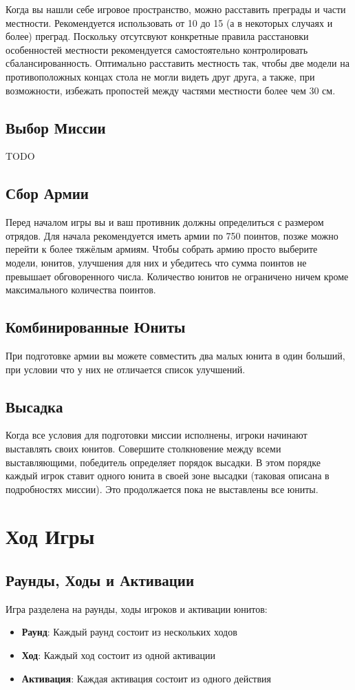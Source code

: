 \documentclass[twocolumn]{article}
\newcommand{\h}[1]{\textbf{#1}}
\newcommand{\TODO}{\begin{center}\color{red}TODO\end{center}}
\begin{document}
Когда вы нашли себе игровое пространство, можно расставить преграды и части местности. Рекомендуется использовать от 10 до 15 (а в некоторых случаях и более) преград. Поскольку отсутсвуют конкретные правила расстановки особенностей местности рекомендуется самостоятельно контролировать сбалансированность. Оптимально расставить местность так, чтобы две модели на противоположных концах стола не могли видеть друг друга, а также, при возможности, избежать пропостей между частями местности более чем 30 см.

\subsection{Выбор Миссии}
\TODO

\subsection{Сбор Армии}
Перед началом игры вы и ваш противник должны определиться с размером отрядов. Для начала рекомендуется иметь армии по 750 поинтов, позже можно перейти к более тяжёлым армиям. Чтобы собрать армию просто выберите модели, юнитов, улучшения для них и убедитесь что сумма поинтов не превышает обговоренного числа. Количество юнитов не ограничено ничем кроме максимального количества поинтов.

\subsection{Комбинированные Юниты}
При подготовке армии вы можете совместить два малых юнита в один больший, при условии что у них не отличается список улучшений.

\subsection{Высадка}
Когда все условия для подготовки миссии исполнены, игроки начинают выставлять своих юнитов. Совершите столкновение между всеми выставляющими, победитель определяет порядок высадки. В этом порядке каждый игрок ставит одного юнита в своей зоне высадки (таковая описана в подробностях миссии). Это продолжается пока не выставлены все юниты.

\newpage

\section{Ход Игры}
\subsection{Раунды, Ходы и Активации}
Игра разделена на раунды, ходы игроков и активации юнитов:
\begin{itemize}
    \item \h{Раунд}: Каждый раунд состоит из нескольких ходов
    \item \h{Ход}: Каждый ход состоит из одной активации
    \item \h{Активация}: Каждая активация состоит из одного действия
\end{itemize}
\end{document}
